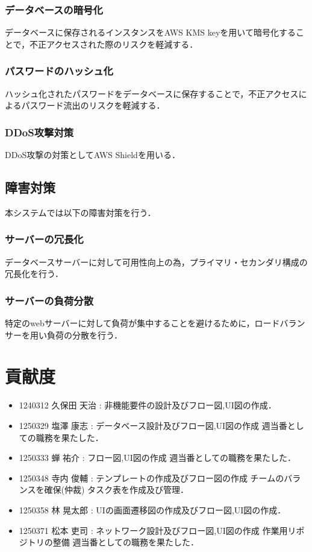\documentclass[a4paper, titlepage]{jsarticle}
\begin{document}
\subsubsection{データベースの暗号化}
データベースに保存されるインスタンスをAWS KMS keyを用いて暗号化することで，不正アクセスされた際のリスクを軽減する．
\subsubsection{パスワードのハッシュ化}
ハッシュ化されたパスワードをデータベースに保存することで，不正アクセスによるパスワード流出のリスクを軽減する．
\subsubsection{DDoS攻撃対策}
DDoS攻撃の対策としてAWS Shieldを用いる．
\subsection{障害対策}
本システムでは以下の障害対策を行う．
\subsubsection{サーバーの冗長化}
データベースサーバーに対して可用性向上の為，プライマリ・セカンダリ構成の冗長化を行う．
\subsubsection{サーバーの負荷分散}
特定のwebサーバーに対して負荷が集中することを避けるために，ロードバランサーを用い負荷の分散を行う．

\section{貢献度}
\begin{itemize}
  \item 1240312 久保田 天治 : 非機能要件の設計及びフロー図,UI図の作成．
  \item 1250329 塩澤 康志 : データベース設計及びフロー図,UI図の作成 週当番としての職務を果たした．
  \item 1250333 蝉 祐介 : フロー図,UI図の作成 週当番としての職務を果たした．
  \item 1250348 寺内 俊輔 : テンプレートの作成及びフロー図の作成 チームのバランスを確保(仲裁) タスク表を作成及び管理．
  \item 1250358 林 晃太郎 : UIの画面遷移図の作成及びフロー図,UI図の作成．
  \item 1250371 松本 吏司 : ネットワーク設計及びフロー図,UI図の作成 作業用リポジトリの整備 週当番としての職務を果たした．
\end{itemize}
\end{document}
